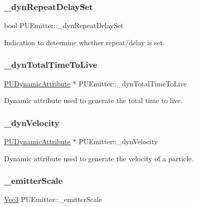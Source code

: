 \subsubsection{\texorpdfstring{\+\_\+dyn\+Repeat\+Delay\+Set}{\_dynRepeatDelaySet}}
{\footnotesize\ttfamily bool P\+U\+Emitter\+::\+\_\+dyn\+Repeat\+Delay\+Set\hspace{0.3cm}{\ttfamily [protected]}}

Indication to determine whether repeat/delay is set. \mbox{\label{classPUEmitter_af374b7e83baedd42ad0f70f9b31fe9c1}} 
\subsubsection{\texorpdfstring{\+\_\+dyn\+Total\+Time\+To\+Live}{\_dynTotalTimeToLive}}
{\footnotesize\ttfamily \hyperlink{classPUDynamicAttribute}{P\+U\+Dynamic\+Attribute} $\ast$ P\+U\+Emitter\+::\+\_\+dyn\+Total\+Time\+To\+Live\hspace{0.3cm}{\ttfamily [protected]}}

Dynamic attribute used to generate the total time to live. \mbox{\label{classPUEmitter_a999b98981c28389ef7090a07231b6c56}} 
\subsubsection{\texorpdfstring{\+\_\+dyn\+Velocity}{\_dynVelocity}}
{\footnotesize\ttfamily \hyperlink{classPUDynamicAttribute}{P\+U\+Dynamic\+Attribute} $\ast$ P\+U\+Emitter\+::\+\_\+dyn\+Velocity\hspace{0.3cm}{\ttfamily [protected]}}

Dynamic attribute used to generate the velocity of a particle. \mbox{\label{classPUEmitter_a950d7644bf868952d1372ea316c16b04}} 
\subsubsection{\texorpdfstring{\+\_\+emitter\+Scale}{\_emitterScale}}
{\footnotesize\ttfamily \hyperlink{classVec3}{Vec3} P\+U\+Emitter\+::\+\_\+emitter\+Scale\hspace{0.3cm}{\ttfamily [protected]}}

